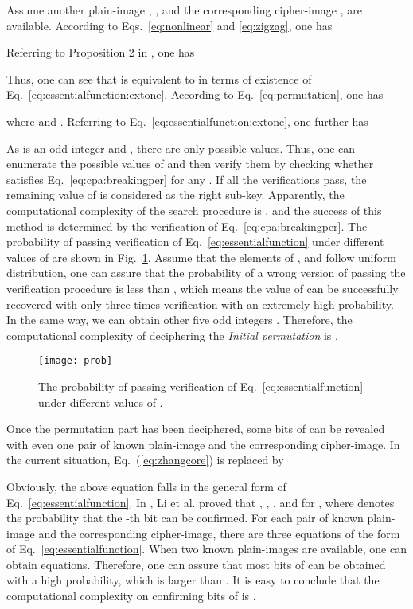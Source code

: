 \documentclass{ws-ijbc}
\newlength\singleimagewidth
\newlength\imagewidth
\begin{document}
Assume another plain-image  , ,
and the corresponding cipher-image
,
are available.
According to Eqs.~\eqref{eq:nonlinear} and \eqref{eq:zigzag},
one has

Referring to Proposition 2 in \cite{Li:hyperchaotic:ND2013}, one has
\begin{linenomath}

\end{linenomath}
Thus, one can see that  is equivalent to 
in terms of existence of Eq.~\eqref{eq:essentialfunction:extone}.
According to Eq.~\eqref{eq:permutation}, one has
\begin{linenomath}

\end{linenomath}
where  and .
Referring to Eq.~\eqref{eq:essentialfunction:extone}, one further has

As  is an odd integer and ,
there are only  possible values. Thus,
one can enumerate the possible values of  and then verify them by checking whether 
satisfies Eq.~\eqref{eq:cpa:breakingper} for any .
If all the verifications pass, the remaining value of  is considered as the right sub-key.
Apparently, the computational complexity of the search procedure is
,
and the success of this method is determined by
the verification of Eq.~\eqref{eq:cpa:breakingper}.
The probability of  passing verification of
Eq.~\eqref{eq:essentialfunction} under different values of  are shown
in Fig.~\ref{fig:prob}. Assume that the elements of ,
and  follow uniform distribution,
one can assure that the probability of a wrong version of  passing
the verification procedure is less than , which means
the value of  can be successfully recovered with only three times verification with an extremely high probability.
In the same way, we can obtain other five odd integers .
Therefore, the computational complexity of deciphering the \textit{Initial permutation}
is .
\begin{figure}[!htb]
\centering
\texttt{[image: prob]}
\caption{The probability of  passing verification
of Eq.~\eqref{eq:essentialfunction} under different values of .}
\label{fig:prob}
\end{figure}

Once the permutation part has been deciphered,
some bits of  can be revealed with
even one pair of known plain-image and the corresponding cipher-image.
In the current situation, Eq.~(\ref{eq:zhangcore}) is replaced by

Obviously, the above equation falls in the general form of Eq.~\eqref{eq:essentialfunction}.
In \cite[Sec.~3.2]{Cqli:breakmodulo:IJBC13}, Li et al. proved that , , , and
 for , where  denotes the probability that the -th bit can be confirmed.
For each pair of known plain-image and the corresponding cipher-image, there are three equations of the form of Eq.~\eqref{eq:essentialfunction}.
\iffalse Due to the inherent relations among the three equations, it is very hard to estimate
the probability that  can be confirmed.\fi When two known
plain-images are available, one can obtain  equations.
Therefore, one can assure that most bits of  can be obtained with a high probability, which is larger
than . It is easy to conclude that the computational complexity on confirming bits of  is .
\end{document}
